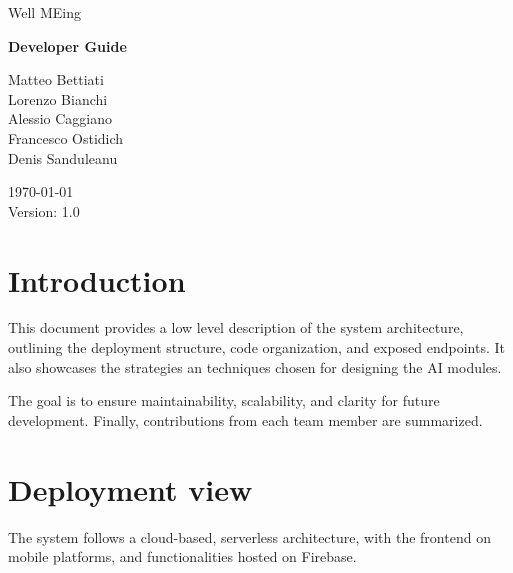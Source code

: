 \documentclass{article}
\begin{document}


\begin{center}

	\fontsize{20pt}{30pt}\selectfont
	Well MEing

	\vspace{2cm}

	\fontsize{25pt}{45pt}\selectfont
	\textbf{Developer Guide}

	\vfill

	\fontsize{12pt}{18pt}\selectfont
	Matteo Bettiati \\
	Lorenzo Bianchi \\
	Alessio Caggiano \\
	Francesco Ostidich \\
	Denis Sanduleanu \\

	\vspace{1cm}

	\today \\
	\vspace{12pt}
	Version: 1.0
	\normalsize

\end{center}

\newpage
{}
\tableofcontents
\newpage



\section{Introduction}

This document provides a low level description of the system architecture, outlining the deployment structure, code organization, and exposed endpoints.
It also showcases the strategies an techniques chosen for designing the AI modules.

The goal is to ensure maintainability, scalability, and clarity for future development.
Finally, contributions from each team member are summarized.

\section{Deployment view}

The system follows a cloud-based, serverless architecture, with the frontend on mobile platforms, and functionalities hosted on Firebase.
\end{document}
